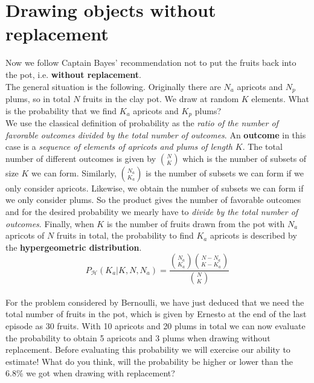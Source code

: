 \documentclass[12pt, a4paper]{scrartcl}
\begin{document}
\section*{Drawing objects without replacement}
Now we follow Captain Bayes' recommendation not to put the fruits back into the pot, i.e. \textbf{without replacement}.\\
The general situation is the following. Originally there are $N_a$ apricots and $N_p$ plums, so in total $N$ fruits in the clay pot. We draw at random $K$ elements.
What is the probability that we find $K_a$ apricots and $K_p$ plums?\\
We use the classical definition of probability as the \textit{ratio of the number of favorable outcomes divided by the total number of outcomes}. 
An \textbf{outcome} in this case is a \textit{sequence of elements of apricots and plums of length $K$}.
The total number of different outcomes is given by ${N \choose K}$ which is the number of subsets of size $K$ we can form. 
Similarly, ${N_a \choose K_a}$ is the number of subsets we can form if we only consider apricots.
Likewise, we obtain the number of subsets we can form if we only consider plums.
So the product gives the number of favorable outcomes and for the desired probability we mearly have to \textit{divide by the total number of outcomes}.
Finally, when $K$ is the number of fruits drawn from the pot with $N_a$ apricots of $N$ fruits in total, the probability to find $K_a$ apricots is described by the \textbf{hypergeometric distribution}.\\%
\begin{equation*}\boxed{P_{\mathcal{H}}(K_a|K,N,N_a)=\frac{{N_a\choose K_a}{N-N_a\choose K-K_a}}{{N\choose K}}
}\end{equation*}\\


For the problem considered by Bernoulli, we have just deduced that we need the total number of fruits in the pot, which is given by Ernesto at the end of the last episode as 30 fruits.
With 10 apricots and 20 plums in total we can now evaluate the probability to obtain 5 apricots and 3 plums when drawing without replacement.
Before evaluating this probability we will exercise our ability to estimate! What do you think, will the probability be higher or lower than the 6.8\% we got when drawing with replacement?\\

\\
\end{document}
